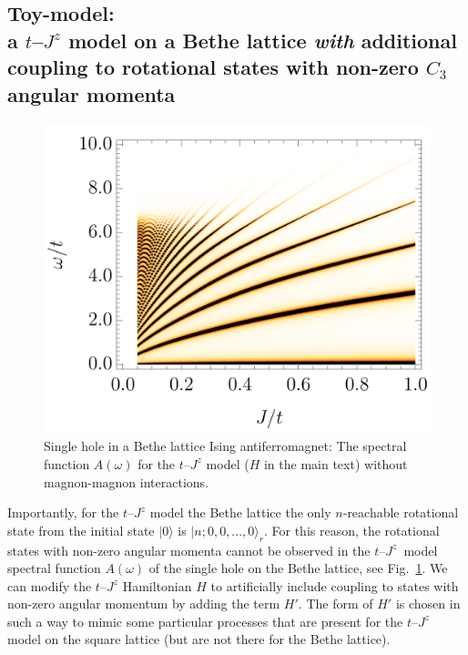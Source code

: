 \documentclass[10pt, a4paper, onecolumn]{article}
\newcommand{\ket}[1]{\vert #1 \rangle}
\begin{document}
\subsection{Toy-model:\\
a $t$--$J^z$ model on a Bethe lattice {\it with} additional\\
coupling to rotational states with non-zero $C_3$ angular momenta}

\begin{figure}[t!]
	\includegraphics[width=0.79\columnwidth]
	{./figures/bethe.png}
	\caption{
		Single hole in a Bethe lattice Ising antiferromagnet: The spectral function $A(\omega)$ for the $t$--$J^z$ model ($H$ in the main text) without magnon-magnon interactions.
	}\label{fig:no_crossing}
\end{figure}

Importantly, for the $t$--$J^z$ model the Bethe lattice the only $n$-reachable rotational state from the initial state $\ket{0}$ is $\ket{n;0,0,...,0}_r$. For this reason, the rotational states with non-zero angular momenta cannot be observed in the $t$--$J^z$~model spectral function $	A(\omega)$ of the single hole on the Bethe lattice, see Fig.~\ref{fig:no_crossing}. We can modify the $t$--$J^z$ Hamiltonian $H$ to artificially include coupling to states with non-zero angular momentum by adding the term $H'$. The form of $H'$ is chosen in such a way to mimic some particular processes that are present for the $t$--$J^z$ model on the square lattice (but are not there for the Bethe lattice).
\end{document}
